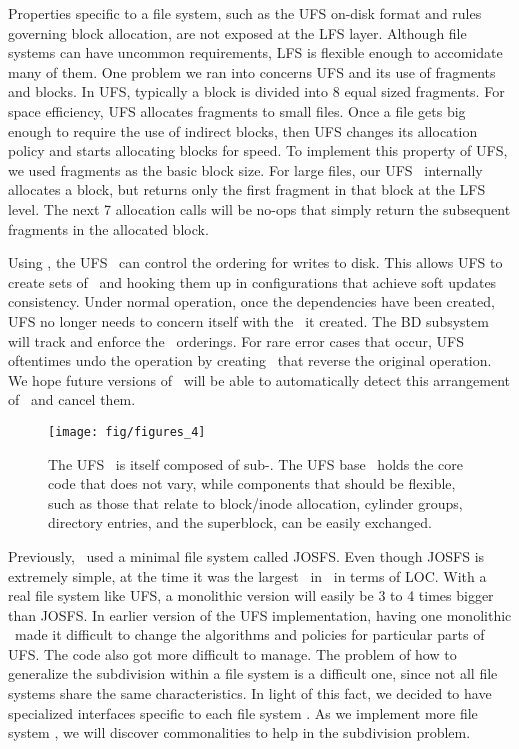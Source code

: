 Properties specific to a file system, such as the UFS on-disk format and rules
governing block allocation, are not exposed at the LFS layer. Although file
systems can have uncommon requirements, LFS is flexible enough to accomidate
many of them. One problem we ran into concerns UFS and its use of fragments
and blocks. In UFS, typically a block is divided into 8 equal sized fragments.
For space efficiency, UFS allocates fragments to small files. Once a file gets
big enough to require the use of indirect blocks, then UFS changes its
allocation policy and starts allocating blocks for speed. To implement this
property of UFS, we used fragments as the basic block size. For large files,
our UFS \module\ internally allocates a block, but returns only the first
fragment in that block at the LFS level. The next 7 allocation calls will be
no-ops that simply return the subsequent fragments in the allocated block.

Using \chdescs, the UFS \module\ can control the ordering for writes to disk.
This allows UFS to create sets of \chdescs\ and hooking them up in
configurations that achieve soft updates consistency. Under normal operation,
once the dependencies have been created, UFS no longer needs to concern itself
with the \chdescs\ it created. The BD subsystem will track and enforce the
\chdesc\ orderings. For rare error cases that occur, UFS oftentimes
undo the operation by creating \chdescs\ that reverse the original operation.
We hope future versions of \Kudos\ will be able to automatically detect this
arrangement of \chdescs\ and cancel them.

\begin{figure}[tb]
  \centering
  \texttt{[image: fig/figures\_4]}
  \caption{\label{fig:ufsmodules} The UFS \module\ is itself composed of
  sub-\modules. The UFS base \module\ holds the core code that does not vary,
  while components that should be flexible, such as those that relate to
  block/inode allocation, cylinder groups, directory entries, and the
  superblock, can be easily exchanged.}
\end{figure}

Previously, \Kudos\ used a minimal file system called JOSFS. Even though JOSFS
is extremely simple, at the time it was the largest \module\ in \Kudos\ in
terms of LOC. With a real file system like UFS, a monolithic version will easily be
3 to 4 times bigger than JOSFS. In earlier version of the \Kudos UFS
implementation, having one monolithic \module\ made it difficult to change the
algorithms and policies for particular parts of UFS. The code also got more
difficult to manage. The problem of how to generalize the subdivision within
a file system is a difficult one, since not all file systems share the same
characteristics. In light of this fact, we decided to have specialized
interfaces specific to each file system \module. As we implement more file
system \modules, we will discover commonalities to help in the subdivision
problem.

